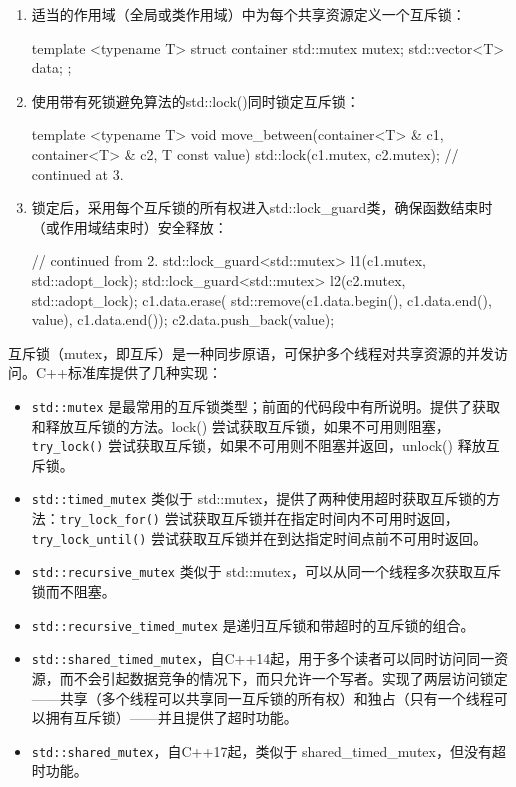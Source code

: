 \begin{enumerate}
\item
适当的作用域（全局或类作用域）中为每个共享资源定义一个互斥锁：

\begin{cpp}
template <typename T>
struct container
{
    std::mutex     mutex;
    std::vector<T> data;
};
\end{cpp}

\item
使用带有死锁避免算法的std::lock()同时锁定互斥锁：

\begin{cpp}
template <typename T>
void move_between(container<T> & c1, container<T> & c2,
                  T const value)
{
    std::lock(c1.mutex, c2.mutex);
    // continued at 3.
}
\end{cpp}

\item
锁定后，采用每个互斥锁的所有权进入std::lock\_guard类，确保函数结束时（或作用域结束时）安全释放：

\begin{cpp}
// continued from 2.
std::lock_guard<std::mutex> l1(c1.mutex, std::adopt_lock);
std::lock_guard<std::mutex> l2(c2.mutex, std::adopt_lock);
c1.data.erase(
    std::remove(c1.data.begin(), c1.data.end(), value),
    c1.data.end());
c2.data.push_back(value);
\end{cpp}
\end{enumerate}


互斥锁（mutex，即互斥）是一种同步原语，可保护多个线程对共享资源的并发访问。C++标准库提供了几种实现：

\begin{itemize}
\item
\verb|std::mutex| 是最常用的互斥锁类型；前面的代码段中有所说明。提供了获取和释放互斥锁的方法。lock() 尝试获取互斥锁，如果不可用则阻塞，\verb|try_lock()| 尝试获取互斥锁，如果不可用则不阻塞并返回，unlock() 释放互斥锁。

\item
\verb|std::timed_mutex| 类似于 std::mutex，提供了两种使用超时获取互斥锁的方法：\verb|try_lock_for()| 尝试获取互斥锁并在指定时间内不可用时返回，\verb|try_lock_until()| 尝试获取互斥锁并在到达指定时间点前不可用时返回。

\item
\verb|std::recursive_mutex| 类似于 std::mutex，可以从同一个线程多次获取互斥锁而不阻塞。

\item
\verb|std::recursive_timed_mutex| 是递归互斥锁和带超时的互斥锁的组合。

\item
\verb|std::shared_timed_mutex|，自C++14起，用于多个读者可以同时访问同一资源，而不会引起数据竞争的情况下，而只允许一个写者。实现了两层访问锁定——共享（多个线程可以共享同一互斥锁的所有权）和独占（只有一个线程可以拥有互斥锁）——并且提供了超时功能。

\item
\verb|std::shared_mutex|，自C++17起，类似于 shared\_timed\_mutex，但没有超时功能。
\end{itemize}

